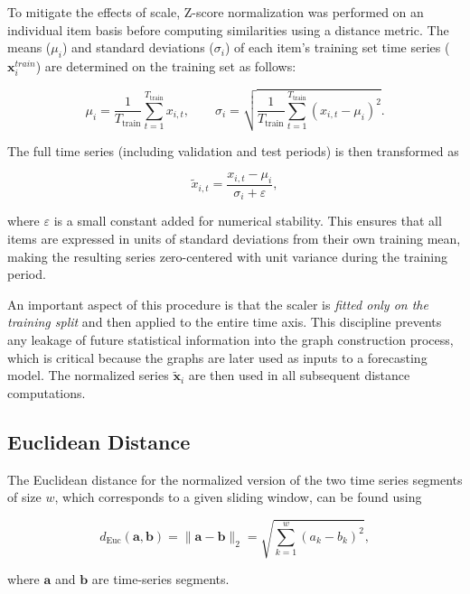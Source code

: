 To mitigate the effects of scale, Z-score normalization was performed on an individual item basis before computing similarities using a distance metric. The means ($\mu_{i}$) and standard deviations ($\sigma_{i}$) of each item's training set time series ($\mathbf{x}_{i}^{train}$) are determined on the training set as follows:

\begin{equation}
    \mu_i = \frac{1}{T_{\text{train}}} \sum_{t=1}^{T_{\text{train}}} x_{i,t}, \qquad
    \sigma_i = \sqrt{\frac{1}{T_{\text{train}}} \sum_{t=1}^{T_{\text{train}}} \left(x_{i,t} - \mu_i\right)^2}.
\end{equation}

The full time series (including validation and test periods) is then transformed as

\begin{equation}
    \tilde{x}_{i,t} = \frac{x_{i,t} - \mu_i}{\sigma_i + \varepsilon},
\end{equation}

where $\varepsilon$ is a small constant added for numerical stability. This ensures that all items are expressed in units of standard deviations from their own training mean, making the resulting series zero-centered with unit variance during the training period.

An important aspect of this procedure is that the scaler is \textit{fitted only on the training split} and then applied to the entire time axis. This discipline prevents any leakage of future statistical information into the graph construction process, which is critical because the graphs are later used as inputs to a forecasting model. The normalized series $\tilde{\mathbf{x}}_i$ are then used in all subsequent distance computations.

\subsection{Euclidean Distance}

The Euclidean distance for the normalized version of the two time series segments of size $w$, which corresponds to a given sliding window, can be found using

\begin{equation}
d_{\text{Euc}}(\mathbf{a}, \mathbf{b}) = \|\mathbf{a} - \mathbf{b}\|_2 = \sqrt{\sum_{k=1}^{w} (a_k - b_k)^2},
\end{equation}

where $\mathbf{a}$ and $\mathbf{b}$ are time-series segments.

